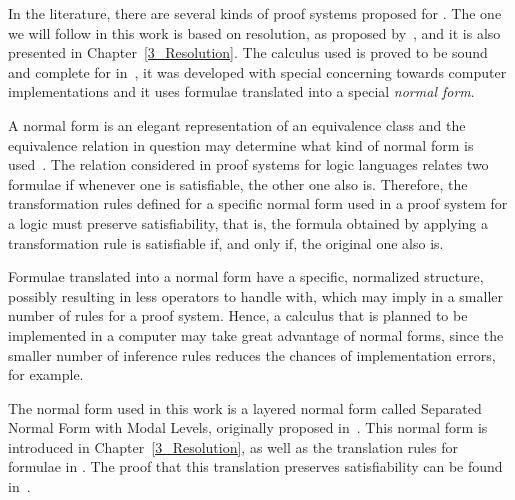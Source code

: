 In the literature, there are several kinds of proof systems proposed for
. The one we will follow in this work is based on resolution, as
proposed by~\cite{nalon2015modal}, and it is also presented in
Chapter~\ref{3_Resolution}. The calculus used is proved to be sound and complete
for  in~\cite{nalon2015modal}, it was developed with special concerning towards computer implementations and it uses formulae translated into a special
\emph{normal form}.

A normal form is an elegant representation of an equivalence class and the
equivalence relation in question may determine what kind of normal form is
used~\cite{normalformtheory}. The relation considered in proof systems for logic
languages relates two formulae if whenever one is satisfiable, the other one
also is. Therefore, the transformation rules defined for a specific normal form
used in a proof system for a logic must preserve satisfiability, that is, the
formula obtained by applying a transformation rule is satisfiable if, and only
if, the original one also is. 

Formulae translated into a normal form have a specific, normalized structure,
possibly resulting in less operators to handle with, which may imply in a
smaller number of rules for a proof system. Hence, a calculus that is planned to
be implemented in a computer may take great advantage of normal forms, since the
smaller number of inference rules reduces the chances of implementation errors, for
example. 

The normal form used in this work is a layered normal form called Separated
Normal Form with Modal Levels, originally proposed
in~\cite{journals/jal/NalonD07}. This normal form is introduced in
Chapter~\ref{3_Resolution}, as well as the translation rules for formulae in
. The proof that this translation preserves satisfiability can be
found in~\cite{journals/jal/NalonD07}.
